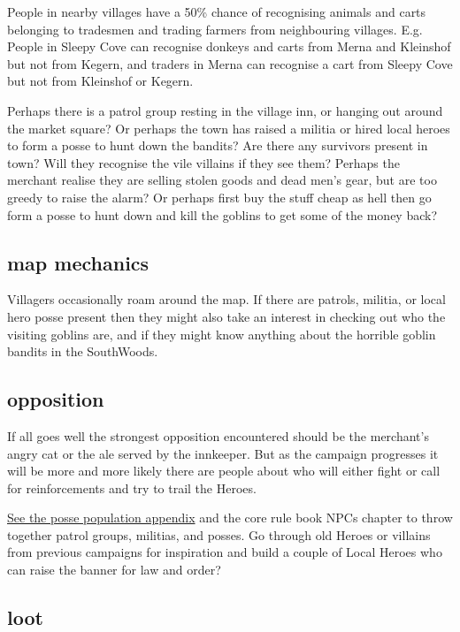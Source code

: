 People in nearby villages have a 50\% chance of recognising animals and carts belonging to tradesmen and trading farmers from neighbouring villages. E.g. People in Sleepy Cove can recognise donkeys and carts from Merna and Kleinshof but not from Kegern, and traders in Merna can recognise a cart from Sleepy Cove but not from Kleinshof or Kegern.

Perhaps there is a patrol group resting in the village inn, or hanging out around the market square? Or perhaps the town has raised a militia or hired local heroes to form a posse to hunt down the bandits? Are there any survivors present in town? Will they recognise the vile villains if they see them?
Perhaps the merchant realise they are selling stolen goods and dead men's gear, but are too greedy to raise the alarm? Or perhaps first buy the stuff cheap as hell then go form a posse to hunt down and kill the goblins to get some of the money back?


\subsection*{map mechanics}

Villagers occasionally roam around the map. If there are patrols, militia, or local hero posse present then they might also take an interest in checking out who the visiting goblins are, and if they might know anything about the horrible goblin bandits in the SouthWoods.


\subsection*{opposition}

If all goes well the strongest opposition encountered should be the merchant's angry cat or the ale served by the innkeeper. But as the campaign progresses it will be more and more likely there are people about who will either fight or call for reinforcements and try to trail the Heroes.

\hyperref[appendixpossepopulation]{See the posse population appendix} and the core rule book NPCs chapter to throw together patrol groups, militias, and posses. Go through old Heroes or villains from previous campaigns for inspiration and build a couple of Local Heroes who can raise the banner for law and order?


\subsection*{loot}

